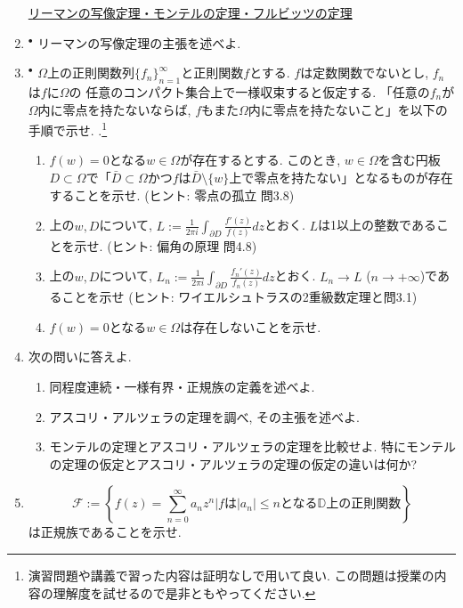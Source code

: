 \documentclass[dvipdfmx,a4paper,11pt]{article}
\newcommand{\D}{\mathbb{D}}
\theoremstyle{definition}
\begin{document}
\begin{enumerate}[label=\textbf{問}8.\arabic*]
   

\hspace{-36pt}\underline{リーマンの写像定理・モンテルの定理・フルビッツの定理}
\item $^{\bullet}$ リーマンの写像定理の主張を述べよ.
    
 \item $^{\bullet}$ $\Omega$上の正則関数列$\{ f_{n}\}_{n=1}^{\infty}$と正則関数$f$とする. $f$は定数関数でないとし, $f_n$は$f$に$\Omega$の 任意のコンパクト集合上で一様収束すると仮定する. 
「任意の$f_{n}$が$\Omega$内に零点を持たないならば, $f$もまた$\Omega$内に零点を持たないこと」を以下の手順で示せ. .\footnote{演習問題や講義で習った内容は証明なしで用いて良い. この問題は授業の内容の理解度を試せるので是非ともやってください.}
 \begin{enumerate}
\setlength{\parskip}{0cm} 
  \setlength{\itemsep}{0cm} 
  \item $f(w)=0$となる$w \in \Omega$が存在するとする. このとき, $w \in\Omega$を含む円板$D \subset \Omega$で「$\bar{D} \subset \Omega$かつ$f$は$\bar{D} \setminus \{ w\}$上で零点を持たない」となるものが存在することを示せ. (ヒント: 零点の孤立 問3.8)
  \item 上の$w, D$について, $L := \frac{1}{2 \pi i} \int_{\partial D}\frac{f'(z)}{f(z) } dz$とおく. $L$は1以上の整数であることを示せ. (ヒント: 偏角の原理 問4.8)
  \item 上の$w, D$について, $L_{n} :=  \frac{1}{2 \pi i} \int_{\partial D}\frac{f_{n}'(z)}{f_{n}(z) } dz$とおく. $L_{n} \to L$ ($n \to + \infty$)であることを示せ (ヒント: ワイエルシュトラスの2重級数定理と問3.1)
  \item $f(w)=0$となる$w \in \Omega$は存在しないことを示せ.
 \end{enumerate} 
    
\item 次の問いに答えよ.
 \begin{enumerate}
\setlength{\parskip}{0cm} 
  \setlength{\itemsep}{0cm} 
  \item 同程度連続・一様有界・正規族の定義を述べよ.
  \item アスコリ・アルツェラの定理を調べ, その主張を述べよ.
  \item モンテルの定理とアスコリ・アルツェラの定理を比較せよ. 特にモンテルの定理の仮定とアスコリ・アルツェラの定理の仮定の違いは何か?
    \end{enumerate} 

\item $$\mathcal{F} := \left\{ f(z) = \sum_{n=0}^{\infty}a_n z^n | \text{$f$は$|a_n| \le n$となる$\D$上の正則関数}\right\}$$
は正規族であることを示せ.
  

\end{enumerate}
\end{document}
